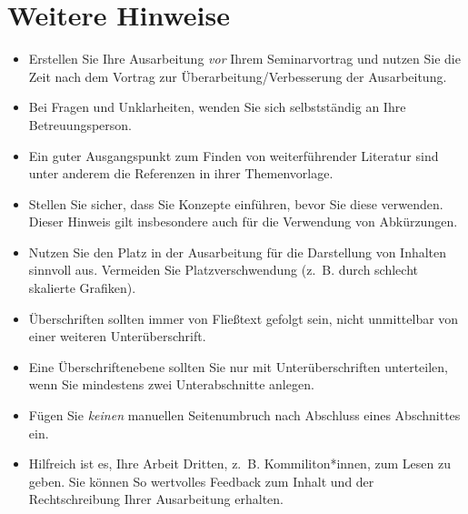 \section{Weitere Hinweise}
\begin{itemize}
\item Erstellen Sie Ihre Ausarbeitung \emph{vor} Ihrem Seminarvortrag und nutzen Sie die Zeit nach
  dem Vortrag zur Überarbeitung/Verbesserung der Ausarbeitung.
\item Bei Fragen und Unklarheiten, wenden Sie sich selbstständig an Ihre Betreuungsperson.
\item Ein guter Ausgangspunkt zum Finden von weiterführender Literatur sind unter anderem die
  Referenzen in ihrer Themenvorlage.
\item Stellen Sie sicher, dass Sie Konzepte einführen, bevor Sie diese verwenden. Dieser Hinweis
  gilt insbesondere auch für die Verwendung von Abkürzungen.
\item Nutzen Sie den Platz in der Ausarbeitung für die Darstellung von Inhalten sinnvoll
  aus. Vermeiden Sie Platzverschwendung (z.~B. durch schlecht skalierte Grafiken).
\item Überschriften sollten immer von Fließtext gefolgt sein, nicht unmittelbar von einer weiteren
  Unterüberschrift.
\item Eine Überschriftenebene sollten Sie nur mit Unterüberschriften unterteilen, wenn Sie
  mindestens zwei Unterabschnitte anlegen.
\item Fügen Sie \emph{keinen} manuellen Seitenumbruch nach Abschluss eines Abschnittes ein.
\item Hilfreich ist es, Ihre Arbeit Dritten, z.~B. Kommiliton*innen, zum Lesen zu geben. Sie können So
  wertvolles Feedback zum Inhalt und der Rechtschreibung Ihrer Ausarbeitung erhalten.
\end{itemize}
